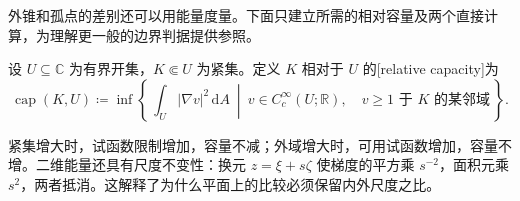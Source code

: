\ProseParagraphBreak

外锥和孤点的差别还可以用能量度量。下面只建立所需的相对容量及两个直接计算，为理解更一般的边界判据提供参照。

\begin{definition}\label{b3:def:16-relative-capacity}
设 \(U\subseteq\mathbb C\) 为有界开集，\(K\Subset U\) 为紧集。定义 \(K\) 相对于 \(U\) 的[relative capacity]为
\[
 \operatorname{cap}(K,U)\coloneqq
 \inf\left\{\,\int_U|\nabla v|^2\,\mathrm{d}A
 \ \middle|\ v\in C_c^\infty(U;\mathbb R),\quad
 v\ge1\text{ 于 }K\text{ 的某邻域}\,\right\}.
\]
\end{definition}

紧集增大时，试函数限制增加，容量不减；外域增大时，可用试函数增加，容量不增。二维能量还具有尺度不变性：换元 \(z=\xi+s\zeta\) 使梯度的平方乘 \(s^{-2}\)，面积元乘 \(s^2\)，两者抵消。这解释了为什么平面上的比较必须保留内外尺度之比。

